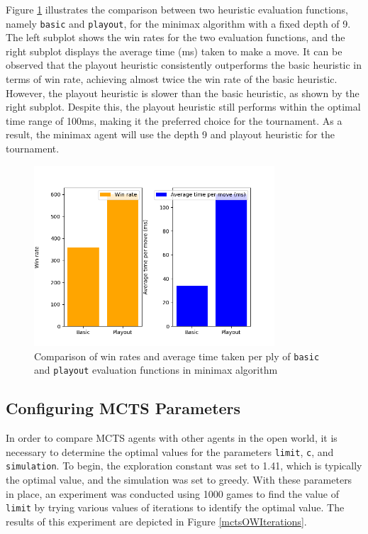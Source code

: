 Figure \ref{minimaxOWEval} illustrates the comparison between two heuristic evaluation functions, namely \texttt{basic} and \texttt{playout}, for the minimax algorithm with a fixed depth of 9. The left subplot shows the win rates for the two evaluation functions, and the right subplot displays the average time (ms) taken to make a move. It can be observed that the playout heuristic consistently outperforms the basic heuristic in terms of win rate, achieving almost twice the win rate of the basic heuristic. However, the playout heuristic is slower than the basic heuristic, as shown by the right subplot. Despite this, the playout heuristic still performs within the optimal time range of 100ms, making it the preferred choice for the tournament. As a result, the minimax agent will use the depth 9 and playout heuristic for the tournament.

\begin{figure}[h]
  \centering
  \captionsetup{justification=centering}
  \includegraphics[width=0.8\textwidth]{../img/minimax_eval_openworld.png}
  \caption{Comparison of win rates and average time taken per ply of \texttt{basic} and \texttt{playout} evaluation functions in minimax algorithm}
  \label{minimaxOWEval}
\end{figure}

\subsection{Configuring MCTS Parameters}

In order to compare MCTS agents with other agents in the open world, it is necessary to determine the optimal values for the parameters \texttt{limit}, \texttt{c}, and \texttt{simulation}. To begin, the exploration constant was set to 1.41, which is typically the optimal value, and the simulation was set to greedy. With these parameters in place, an experiment was conducted using 1000 games to find the value of \texttt{limit} by trying various values of iterations to identify the optimal value. The results of this experiment are depicted in Figure \ref{mctsOWIterations}.

